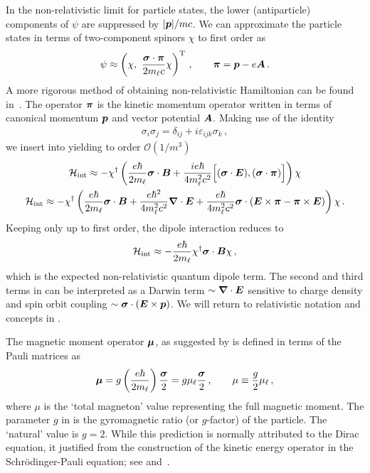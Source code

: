 In the non-relativistic limit for particle states, the lower (antiparticle) components of $\psi$ are suppressed by $|\boldsymbol{p}|/mc$. We can approximate the particle states in terms of two-component spinors $\chi$ to first order as
\begin{align}
    \label{approx:1}
    \psi\approx\left(\chi,\ \frac{\bb{\sigma}\cdot\bb{\pi}}{2m_{\ell}c}\chi\right)^\mathrm{T}\,,\qquad \bb{\pi}=\bb{p}-e\bb{A}\,.
\end{align}
A more rigorous method of obtaining non-relativistic Hamiltonian can be found in~\cite{Foldy:1949wa}. The operator $\boldsymbol{\pi}$ is the kinetic momentum operator written in terms of canonical momentum $\boldsymbol{p}$ and vector potential $\boldsymbol{A}$. Making use of the identity
\begin{align}
    \sigma_{i}\sigma_{j} = \delta_{ij} + i\varepsilon_{ijk}\sigma_{k}\,,
\end{align}
we insert  into  yielding to order $\mathcal{O}(1/m^{3})$
\begin{gather}
    \label{ham:1}
    \mathcal{H}_\mathrm{int} \approx -\chi^{\dag}\left(\frac{e\hbar}{2m_{\ell}}\boldsymbol{\sigma}\cdot\boldsymbol{B}
    +\frac{ie\hbar}{4m_{\ell}^{2}c^{2}}\Big[(\boldsymbol{\sigma}\cdot\boldsymbol{E}),(\boldsymbol{\sigma}\cdot\boldsymbol{\pi})\Big]\right)\chi\\
    \label{ham:2}
    \mathcal{H}_\mathrm{int} \approx -\chi^{\dag}\left(\frac{e\hbar}{2m_{\ell}}\boldsymbol{\sigma}\cdot\boldsymbol{B}
    +\frac{e\hbar^{2}}{4m_{\ell}^{2}c^{2}}\boldsymbol{\nabla}\cdot\boldsymbol{E}
    +\frac{e\hbar}{4m_{\ell}^{2}c^{2}}\boldsymbol{\sigma}\cdot\left(\boldsymbol{E}\times\boldsymbol{\pi}-\boldsymbol{\pi}\times\boldsymbol{E}\right)\right)\chi\,.
\end{gather}
Keeping only up to first order, the dipole interaction  reduces to 
\begin{gather}
	\label{pauli:3}
    \mathcal{H}_\mathrm{int} \approx -\frac{e\hbar}{2m_{\ell}}\chi^{\dag}\boldsymbol{\sigma}\cdot\boldsymbol{B}\chi\,,
\end{gather}
which is the expected non-relativistic quantum dipole term. The second and third terms in  can be interpreted as a Darwin term $\sim\boldsymbol{\nabla}\cdot\boldsymbol{E}$ sensitive to charge density and spin orbit coupling $\sim\boldsymbol{\sigma}\cdot(\boldsymbol{E}\times\boldsymbol{p})$. We will return to relativistic notation and concepts in .

The magnetic moment operator $\boldsymbol{\mu}$, as suggested by  is defined in terms of the Pauli matrices as
\begin{gather}
    \label{mag:3}
    \boldsymbol{\mu}=g\left(\frac{e\hbar}{2m_{\ell}}\right)\frac{\boldsymbol{\sigma}}{2}=g\mu_{\ell}\frac{\boldsymbol{\sigma}}{2}\,,\qquad\mu\equiv\frac{g}{2}\mu_{\ell}\,,
\end{gather}
where $\mu$ is the `total magneton' value representing the full magnetic moment. The parameter $g$ in  is the gyromagnetic ratio (or $g$-factor) of the particle. The `natural' value is $g\!=\!2$. While this prediction is normally attributed to the Dirac equation, it justified from the construction of the kinetic energy operator in the Schr{\"o}dinger-Pauli equation; see  and~\cite{sakurai1967advanced}.

